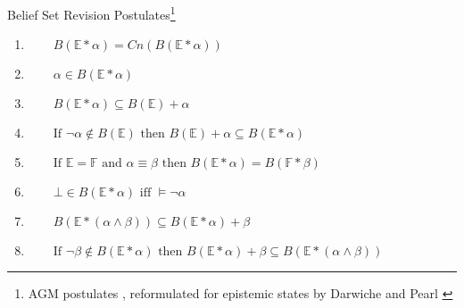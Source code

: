 \documentclass[12pt, notheorems]{beamer}
\theoremstyle{definition}
\theoremstyle{example}
\theoremstyle{plain}
\begin{document}
\begin{frame}{Belief Set Revision Postulates\footnote{AGM postulates \cite{Alchourron1985}, reformulated for epistemic states by Darwiche and Pearl \cite{Darwiche1997}}}
    \label{slide:e1-8}
    \begin{enumerate}[wide=0pt, widest=99,leftmargin=\parindent,label = ($\mathbb{E}\!*\!\arabic*$)]
        \item\label{E1} $\qquad B(\mathbb{E}\ast\alpha) = Cn(B(\mathbb{E}\ast\alpha))$
        \item\label{E2} $\qquad \alpha \in B(\mathbb{E}\ast\alpha)$
        \item\label{E3} $\qquad B(\mathbb{E}\ast\alpha)  \subseteq B(\mathbb{E})+\alpha$
        \item\label{E4} $\qquad \textrm{If } \neg \alpha \notin B(\mathbb{E}) \textrm{ then } B(\mathbb{E}) + \alpha \subseteq B(\mathbb{E} \ast \alpha)$
        \item\label{E5} $\qquad \textrm{If } \mathbb{E} = \mathbb{F} \textrm{ and } \alpha \equiv \beta \textrm{ then } B(\mathbb{E} \ast \alpha) = B(\mathbb{F} \ast \beta)$
        \item\label{E6} $\qquad \bot \in B(\mathbb{E} \ast \alpha) \textrm{ iff } \models \neg \alpha$
        \item\label{E7} $\qquad B(\mathbb{E} \ast (\alpha \wedge \beta)) \subseteq B(\mathbb{E} \ast \alpha) + \beta$
        \item\label{E8} $\qquad \textrm{If } \neg \beta \notin B(\mathbb{E} \ast \alpha) \textrm{ then } B(\mathbb{E} \ast \alpha) + \beta \subseteq B(\mathbb{E} \ast (\alpha \wedge \beta))$
    \end{enumerate}


\end{frame}
\end{document}
